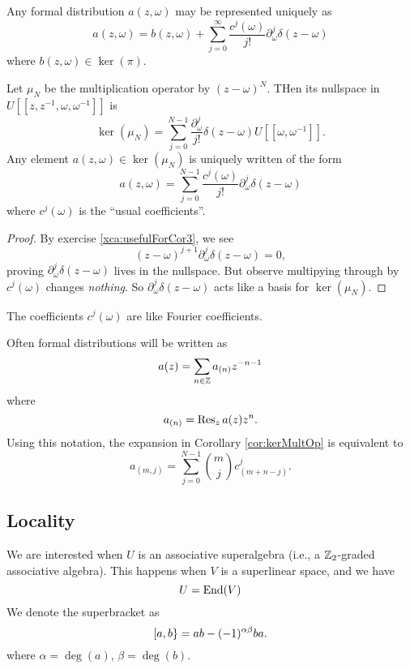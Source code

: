 \begin{cor}
Any formal distribution $a(z,\omega)$ may be represented uniquely as
\begin{equation}
a(z,\omega)=b(z,\omega) + \sum^{\infty}_{j=0}\frac{c^{j}(\omega)}{j!}\partial^{j}_{\omega}\delta(z-\omega)
\end{equation}
where $b(z,\omega)\in\ker(\pi)$.
\end{cor}
\begin{cor}\label{cor:kerMultOp}
Let $\mu_{N}$ be the multiplication operator by $(z-\omega)^{N}$. THen
its nullspace in $U[[z,z^{-1},\omega,\omega^{-1}]]$ is
\begin{equation}
\ker(\mu_{N})=\sum^{N-1}_{j=0}\frac{\partial^{j}_{\omega}}{j!}\delta(z-\omega)U[[\omega,\omega^{-1}]].
\end{equation}
Any element $a(z,\omega)\in\ker(\mu_N)$ is uniquely written of the form
\begin{equation}
a(z,\omega)=\sum^{N-1}_{j=0}\frac{c^{j}(\omega)}{j!}\partial^{j}_{\omega}\delta(z-\omega)
\end{equation}
where $c^{j}(\omega)$ is the ``usual coefficients''.
\end{cor}
\begin{proof}
By exercise \ref{xca:usefulForCor3}, we see
\begin{equation}
(z-\omega)^{j+1}\partial_{\omega}^{j}\delta(z-\omega)=0,
\end{equation}
proving $\partial_{\omega}^{j}\delta(z-\omega)$ lives in the
nullspace. But observe multipying through by $c^{j}(\omega)$ changes
\emph{nothing}. So $\partial_{\omega}^{j}\delta(z-\omega)$ acts like a
basis for $\ker(\mu_N)$.
\end{proof}
\begin{rmk}
The coefficients $c^{j}(\omega)$ are like Fourier coefficients.
\end{rmk}
Often formal distributions will be written as 
\begin{equation}
a(z)=\sum_{n\in\ZZ}a_{(n)}z^{-n-1}
\end{equation}
where
\begin{equation}
a_{(n)}=\Res[z]{a(z)z^{n}}.
\end{equation}
Using this notation, the expansion in Corollary \ref{cor:kerMultOp} is
equivalent to 
\begin{equation}
a_{(m,j)}=\sum^{N-1}_{j=0}\binom{m}{j}c^{j}_{(m+n-j)}.
\end{equation}

\subsection{Locality}
\M
We are interested when $U$ is an associative superalgebra (i.e., a
$\ZZ_2$-graded associative algebra). This happens when $V$ is a
superlinear space, and we have
\begin{equation}
U=\End(V)
\end{equation}
We denote the superbracket as
\begin{equation}
\superb{a}{b}=ab-(-1)^{\alpha\beta}ba.
\end{equation}
where $\alpha=\deg(a)$, $\beta=\deg(b)$.

